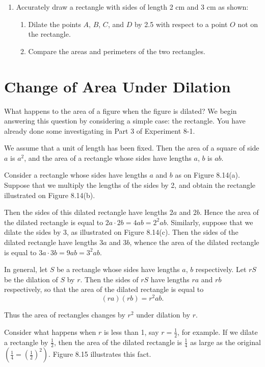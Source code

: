 \documentclass[12pt]{book} %
\begin{document}
\begin{enumerate}
\item Accurately draw a rectangle with sides of length 2 cm and 3 cm as shown:


\begin{enumerate}
\item[(a)] Dilate the points $A$, $B$, $C$, and $D$ by 2.5 with respect to a point $O$ not on the rectangle.

\item[(b)] Compare the areas and perimeters of the two rectangles.
\end{enumerate}
\end{enumerate}

\section{Change of Area Under Dilation}

What happens to the area of a figure when the figure is dilated? We begin answering this question by considering a simple case: the rectangle. You have already done some investigating in Part 3 of Experiment 8-1.

We assume that a unit of length has been fixed. Then the area of a square of side $a$ is $a^2$, and the area of a rectangle whose sides have lengths $a$, $b$ is $ab$.

Consider a rectangle whose sides have lengths $a$ and $b$ as on Figure 8.14(a). Suppose that we multiply the lengths of the sides by 2, and obtain the rectangle illustrated on Figure 8.14(b).


Then the sides of this dilated rectangle have lengths $2a$ and $2b$. Hence the area of the dilated rectangle is equal to $2a\cdot 2b=4ab=2^2ab$. Similarly, suppose that we dilate the sides by 3, as illustrated on Figure 8.14(c). Then the sides of the dilated rectangle have lengths $3a$ and $3b$, whence the area of the dilated rectangle is equal to $3a\cdot 3b=9ab=3^2ab$.

In general, let $S$ be a rectangle whose sides have lengths $a$, $b$ respectively. Let $rS$ be the dilation of $S$ by $r$. Then the sides of $rS$ have lengths $ra$ and $rb$ respectively, so that the area of the dilated rectangle is equal to
\[
(ra)(rb)=r^2ab.
\]

Thus the area of rectangles changes by $r^2$ under dilation by $r$.

Consider what happens when $r$ is less than 1, say $r=\frac12$, for example. If we dilate a rectangle by $\frac12$, then the area of the dilated rectangle is $\frac14$ as large as the original $\left(\frac14=\left(\frac12\right)^2\right)$. Figure 8.15 illustrates this fact.
\end{document}
